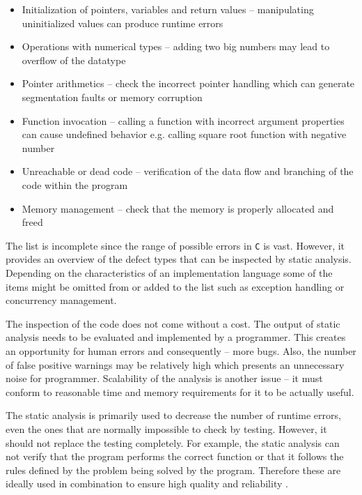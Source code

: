 \documentclass[12pt,final,oneside]{fithesis2}
\theoremstyle{definition}
\begin{document}
\begin{itemize}

\item Initialization of pointers, variables and return values --
manipulating uninitialized values can produce runtime errors

\item Operations with numerical types -- adding two big numbers may lead
to overflow of the datatype

\item Pointer arithmetics -- check the incorrect pointer handling which
can generate segmentation faults or memory corruption

\item Function invocation -- calling a function with incorrect argument
properties can cause undefined behavior e.g. calling square root
function with negative number

\item Unreachable or dead code -- verification of the data flow and
branching of the code within the program

\item Memory management -- check that the memory is properly allocated and
freed

\end{itemize}

The list is incomplete since the range of possible errors in \texttt{C} is
vast. However, it provides an overview of the defect types that can be
inspected by static analysis. Depending on the characteristics of an
implementation language some of the items might be omitted from or added
to the list such as exception handling or concurrency management.

The inspection of the code does not come without a cost.
The output of static analysis needs to be evaluated and implemented by a
programmer. This creates an opportunity for human errors and consequently --
more bugs. Also, the number of false positive warnings may be relatively
high which presents an unnecessary noise for programmer. Scalability
of the analysis is another issue -- it must conform to reasonable time
and memory requirements for it to be actually useful.

The static analysis is primarily used to decrease the number of runtime
errors, even the ones that are normally impossible to check by testing.
However, it should not replace the testing completely. For example,
the static analysis can not verify that the program performs the correct
function or that it follows the rules defined by the problem
being solved by the program. Therefore these are ideally used in
combination to ensure high quality and reliability \cite{Ernst03-1}.
\end{document}
